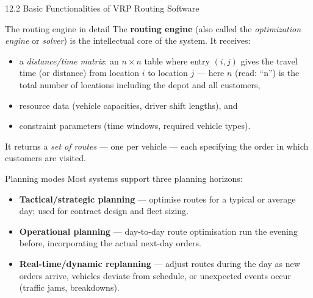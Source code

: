 \documentclass[aspectratio=169,10pt]{beamer}
\begin{document}
\begin{frame}[allowframebreaks]{12.2 \; Basic Functionalities of VRP Routing Software}
  \framebreak

  \begin{block}{The routing engine in detail}
    The \textbf{routing engine} (also called the \emph{optimization engine} or
    \emph{solver}) is the intellectual core of the system.
    It receives:
    \begin{itemize}
      \item a \emph{distance/time matrix}: an $n \times n$ table where entry
            $(i,j)$ gives the travel time (or distance) from location $i$ to
            location $j$ --- here $n$ (read: ``n'') is the total number of
            locations including the depot and all customers,
      \item resource data (vehicle capacities, driver shift lengths), and
      \item constraint parameters (time windows, required vehicle types).
    \end{itemize}
    It returns a \emph{set of routes} --- one per vehicle --- each specifying the
    order in which customers are visited.
  \end{block}

  \begin{block}{Planning modes}
    Most systems support three planning horizons:
    \begin{itemize}
      \item \textbf{Tactical/strategic planning} --- optimise routes for a
            typical or average day; used for contract design and fleet sizing.
      \item \textbf{Operational planning} --- day-to-day route optimisation
            run the evening before, incorporating the actual next-day orders.
      \item \textbf{Real-time/dynamic replanning} --- adjust routes during
            the day as new orders arrive, vehicles deviate from schedule,
            or unexpected events occur (traffic jams, breakdowns).
    \end{itemize}
  \end{block}

  \framebreak


\end{frame}
\end{document}
